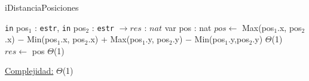 \begin{Algoritmos}
	\begin{algorithm}[H]
		\caption{iDistanciaPosiciones}
		\begin{algorithmic}
			{\texttt{in} pos$_1$ : \texttt{estr}, \texttt{in} pos$_2$ : \texttt{estr}} $\to res$ : $nat$
			\State var pos : nat
			\State $pos \gets$ Max(pos$_1$.x, pos$_2$.x) $-$ Min(pos$_1$.x, pos$_2$.x) + Max(pos$_1$.y, pos$_2$.y) $-$ Min(pos$_1$.y,pos$_2$.y) \Comment $\Theta$(1)
			\State $res \gets$ pos \Comment $\Theta$(1)
			\EndProcedure
		\end{algorithmic}
		\underline{Complejidad:} $\Theta$(1)
	\end{algorithm}
	
\end{Algoritmos}